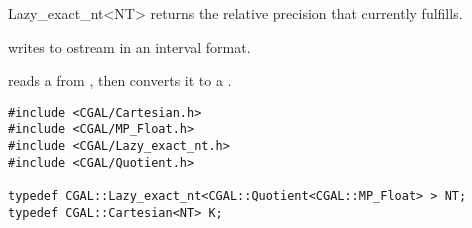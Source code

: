 \begin{ccRefClass} {Lazy_exact_nt<NT>}
{returns the relative precision that  currently fulfills.}

{writes  to ostream  in an interval format.}

{reads a  from , then converts it to a .}

\ccExample

\begin{verbatim}
#include <CGAL/Cartesian.h>
#include <CGAL/MP_Float.h>
#include <CGAL/Lazy_exact_nt.h>
#include <CGAL/Quotient.h>

typedef CGAL::Lazy_exact_nt<CGAL::Quotient<CGAL::MP_Float> > NT;
typedef CGAL::Cartesian<NT> K;
\end{verbatim}

\end{ccRefClass} 

